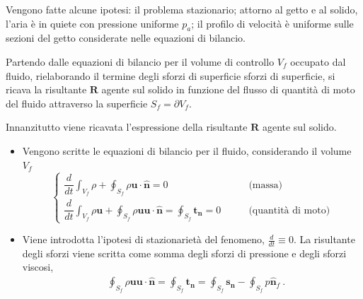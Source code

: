 \parttwo
Vengono fatte alcune ipotesi: il problema stazionario; attorno al getto e al solido, l'aria è in quiete con pressione uniforme $p_a$; il profilo di velocità è uniforme sulle sezioni del getto considerate nelle equazioni di bilancio.

Partendo dalle equazioni di bilancio per il volume di controllo $V_{f}$ occupato dal fluido,  rielaborando il termine degli sforzi di superficie sforzi di superficie, si ricava la risultante $\bm{R}$ agente sul solido in funzione del flusso di quantità di moto del fluido attraverso la superficie $S_{f} = \partial V_f$.

Innanzitutto viene ricavata l'espressione della risultante $\bm{R}$ agente sul solido. 
\begin{itemize}
 \item Vengono scritte le equazioni di bilancio per il fluido, considerando il volume $V_f$
   \begin{equation}
     \begin{cases}
       \dfrac{d}{d t} \displaystyle\int_{V_f} \rho + \oint_{S_f} \rho \bm{u} \cdot \hat{\bm{n}} = 0 & \qquad \text{(massa)} \\
       \dfrac{d}{d t} \displaystyle\int_{V_f} \rho \bm{u} + \oint_{S_f} \rho \bm{u} \bm{u} \cdot \hat{\bm{n}} =
        \oint_{S_f} \bm{t_n} = 0  
        & \qquad \text{(quantità di moto)}  %
      \end{cases}
    \end{equation}
 \item Viene introdotta l'ipotesi di stazionarietà del fenomeno, $\frac{d}{dt}\equiv 0$.
 La risultante degli sforzi viene scritta come somma degli sforzi di pressione e degli sforzi viscosi, 
\begin{equation}
\begin{split}
 & \oint_{S_f} \rho \bm{u} \bm{u} \cdot \hat{\bm{n}} 
  = \oint_{S_{f}}  {\bm{t}}_{\bm{n}} = 
 \oint_{S_{f}}  {\bm{s}}_{\bm{n}} - \oint_{S_f} p {\hat{\bm{n}}}_{f} \ .
\end{split}
\end{equation}




\end{itemize}
